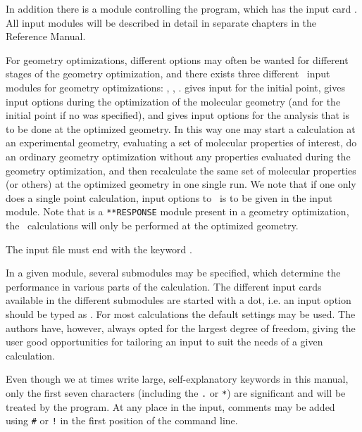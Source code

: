 \begin{list}{}{}
\item {}
\item {}
\item {}
\item {}
\end{list}

In addition there is a module controlling the {\dalton} program, which
has the input card . All
input modules will be described in detail in separate chapters in the
Reference Manual.

For geometry optimizations,
different options may often be wanted for different stages of the
geometry optimization, and there exists three different \aba\ input
modules for geometry optimizations: , ,
.  gives input for the initial point,
 gives input options during the optimization of the
molecular geometry
(and for the initial point if no  was specified),
and  gives input options for the
analysis that is to be done at the optimized geometry. In this way one
may start a calculation at an experimental geometry, evaluating a set
of molecular properties of interest, do an ordinary geometry
optimization without any properties evaluated during the geometry
optimization, and then recalculate the same set of molecular
properties (or others) at the optimized geometry in one single run. We
note that if one only does a single point calculation, input
options to \aba\ is to be given in the  input module.
Note that is a \verb|**RESPONSE| module present in a geometry optimization,
the \resp\ calculations will only be performed at the optimized geometry.

The input file must end with the keyword .

In a given module, several submodules may be
specified, which determine the performance in various parts of the
calculation. The different input cards available
in the different submodules are started with a dot, i.e. an input
option should be typed as . For most calculations the
default settings may be used. The authors have, however, always
opted for the largest degree of freedom, giving the user good
opportunities for tailoring an input to suit the needs of a given
calculation.

Even though we at times write large, self-explanatory keywords in this
manual, only the first seven characters (including the \verb|.| or
\verb|*|) are significant and will be
treated by the program. At any
place in the input, comments may be added using
\verb|#| or \verb|!|
in the first position of the command line.

